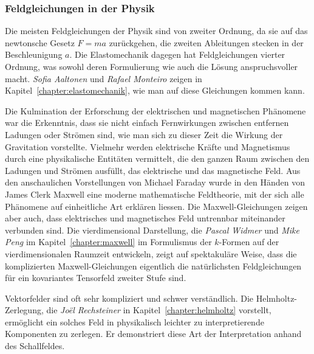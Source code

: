 %
%
\subsubsection{Feldgleichungen in der Physik}

%
%
Die meisten Feldgleichungen der Physik sind von zweiter Ordnung, da
sie auf das newtonsche Gesetz $F=ma$ zurückgehen, die zweiten
Ableitungen stecken in der Beschleunigung $a$.
Die Elastomechanik dagegen hat Feldgleichungen vierter Ordnung,
%
was sowohl deren Formulierung wie auch die Lösung anspruchsvoller
macht.
\emph{Sofia Aaltonen}
%
%
und
\emph{Rafael Monteiro}
%
%
zeigen in Kapitel~\ref{chapter:elastomechanik}, wie man auf diese
Gleichungen kommen kann.

%
%
Die Kulmination der Erforschung der elektrischen und magnetischen
Phänomene war die Erkenntnis, dass sie nicht einfach Fernwirkungen
zwischen entfernen Ladungen oder Strömen sind, wie man sich zu
dieser Zeit die Wirkung der Gravitation vorstellte.
Vielmehr werden elektrische Kräfte und Magnetismus durch eine
physikalische Entitäten vermittelt, die den ganzen Raum zwischen den
Ladungen und Strömen ausfüllt, das elektrische und das magnetische
Feld.
Aus den anschaulichen Vorstellungen von Michael Faraday wurde in den
%
Händen von James Clerk Maxwell eine moderne mathematische Feldtheorie,
%
mit der sich alle Phänomene auf einheitliche Art erklären liessen.
Die Maxwell-Gleichungen zeigen aber auch, dass elektrisches und
magnetisches Feld untrennbar miteinander verbunden sind.
Die vierdimensional Darstellung, die \emph{Pascal Widmer}
%
%
und \emph{Mike Peng}
%
%
im Kapitel~\ref{chapter:maxwell} im Formulismus der $k$-Formen auf
der vierdimensionalen Raumzeit entwickeln, zeigt auf spektakuläre
Weise, dass die komplizierten Maxwell-Gleichungen eigentlich die
natürlichsten Feldgleichungen für ein kovariantes Tensorfeld zweiter
Stufe sind.

%
%
Vektorfelder sind oft sehr kompliziert und schwer verständlich.
Die Helmholtz-Zer\-le\-gung, die
%
\emph{Joël Rechsteiner} 
%
%
in Kapitel~\ref{chapter:helmholtz} vorstellt, ermöglicht ein solches
Feld in physikalisch leichter zu interpretierende Komponenten zu
zerlegen. 
Er demonstriert diese Art der Interpretation anhand des Schallfeldes.

